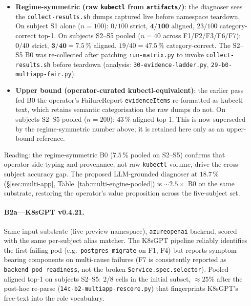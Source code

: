 \documentclass[sigconf, nonacm=true, anonymous=false, review=false]{acmart}
\newcommand{\fp}{FailureReport\xspace}
\newcommand{\fn}[1]{F#1\xspace}
\begin{document}
\begin{itemize}
  \item \textbf{Regime-symmetric (raw \texttt{kubectl} from
    \texttt{artifacts/})}: the diagnoser sees the \texttt{collect-results.sh}
    dumps captured live before namespace teardown.
    On subject S1 alone ($n=100$): $0/100$ strict, $\mathbf{4/100}$
    aligned, $23/100$ category-correct top-1.
    On subjects S2--S5 pooled ($n=40$ across \fn{1}/\fn{2}/\fn{3}/\fn{6}/\fn{7}):
    $0/40$ strict, $\mathbf{3/40 = 7.5\,\%}$ aligned,
    $19/40 = 47.5\,\%$ category-correct. The S2--S5 B0 was re-collected
    after patching \texttt{run-matrix.py} to invoke
    \texttt{collect-results.sh} before teardown
    (analysis: \texttt{30-evidence-ladder.py}, \texttt{29-b0-multiapp-fair.py}).
  \item \textbf{Upper bound (operator-curated kubectl-equivalent)}: the
    earlier pass fed B0 the operator's \fp{} \texttt{evidenceItems}
    re-formatted as kubectl text, which retains semantic categorisation
    the raw dumps do not. On subjects S2--S5 pooled ($n=200$):
    $43\,\%$ aligned top-1. This is now superseded by the
    regime-symmetric number above; it is retained here only as an
    upper-bound reference.
\end{itemize}

Reading: the regime-symmetric B0 ($7.5\,\%$ pooled on S2--S5)
confirms that operator-side typing and provenance, not raw
\texttt{kubectl} volume, drive the cross-subject accuracy gap. The
proposed LLM-grounded diagnoser at $18.7\,\%$
(\S\ref{sec:multi-app}, Table~\ref{tab:multi-engine-pooled}) is
$\sim 2.5\times$ B0 on the same substrate, restoring the operator's
value proposition across the five-subject set.

\paragraph{B2a---K8sGPT v0.4.21.} Same input substrate (live
preview namespace), \texttt{azureopenai} backend, scored with the
same per-subject alias matcher. The K8sGPT pipeline reliably
identifies the first-failing pod (e.g.\ \texttt{postgres-migrate} on
\fn{1}, \fn{4}) but reports symptom-bearing components on
multi-cause failures (\fn{7} is consistently reported as
\texttt{backend pod readiness}, not the broken
\texttt{Service.spec.selector}). Pooled aligned top-1 on subjects
S2--S5: 2/8 cells in the initial subset, $\approx 25\%$ after the
post-hoc re-parse (\texttt{14c-b2-multiapp-rescore.py}) that
fingerprints K8sGPT's free-text into the role vocabulary.
\end{document}
